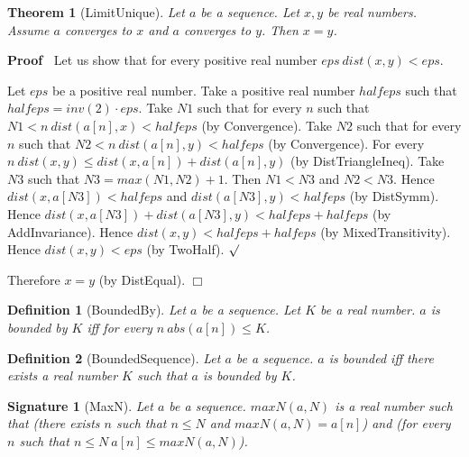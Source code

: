 \documentclass{article}
\newenvironment{forthel}{\begin{leftbar}}{\end{leftbar}}
\newenvironment{proof}{\noindent\textbf{Proof\ }}{\hspace*{\fill}$\Box$\medskip}
\newenvironment{subproof}{\begin{list}{}{}
		\item[\text{Proof}]}{\hfill $\surd$ \end{list}}
\newtheorem{theorem}{Theorem}
\newtheorem{definition}{Definition}
\newtheorem{signature}{Signature}
\begin{document}
\begin{forthel}
	\begin{theorem}[LimitUnique]
	Let $a$ be a sequence. Let $x, y$ be real numbers. Assume $a$ converges to $x$ and $a$ converges to $y$.
	Then $x = y$.
	\end{theorem}
	\begin{proof}
	Let us show that for every positive real number $eps \ dist(x,y) < eps$.
	\begin{subproof}
	Let $eps$ be a positive real number.
	Take a positive real number $halfeps$ such that $halfeps = inv(2) \cdot eps$.
	Take $N1$ such that for every $n$ such that $N1 < n \ dist(a[n],x) < halfeps$ (by Convergence).
	Take $N2$ such that for every $n$ such that $N2 < n \ dist(a[n],y) < halfeps$ (by Convergence).
	For every $n \ dist(x,y) \leq dist(x,a[n]) + dist(a[n],y)$ (by DistTriangleIneq). 
	Take $N3$ such that $N3 = max(N1,N2) + 1$.
	Then $N1 < N3$ and $N2 < N3$.
	Hence $dist(x,a[N3]) < halfeps$ and $dist(a[N3],y) < halfeps$ (by DistSymm).
	Hence $dist(x,a[N3]) + dist(a[N3],y) < halfeps + halfeps$ (by AddInvariance).
	Hence $dist(x,y) < halfeps + halfeps$ (by MixedTransitivity).
	Hence $dist(x,y) < eps$ (by TwoHalf).
	\end{subproof}
	Therefore $x = y$ (by DistEqual).
	\end{proof}
	
	\begin{definition}[BoundedBy]
	Let $a$ be a sequence. Let $K$ be a real number. $a$ is bounded by $K$ iff
	for every $n \ abs(a[n]) \leq K$.
	\end{definition}
	
	\begin{definition}[BoundedSequence]
	Let $a$ be a sequence. $a$ is bounded iff there exists a real number $K$ such that
	$a$ is bounded by $K$.
	\end{definition}
	
	\begin{signature}[MaxN]
	Let $a$ be a sequence. $maxN(a,N)$ is a real number such that
	(there exists $n$ such that $n \leq N$ and $maxN(a,N) = a[n]$) and
	(for every $n$ such that $n \leq N \ a[n] \leq maxN(a,N)$).
	\end{signature}
	

\end{forthel}
\end{document}
